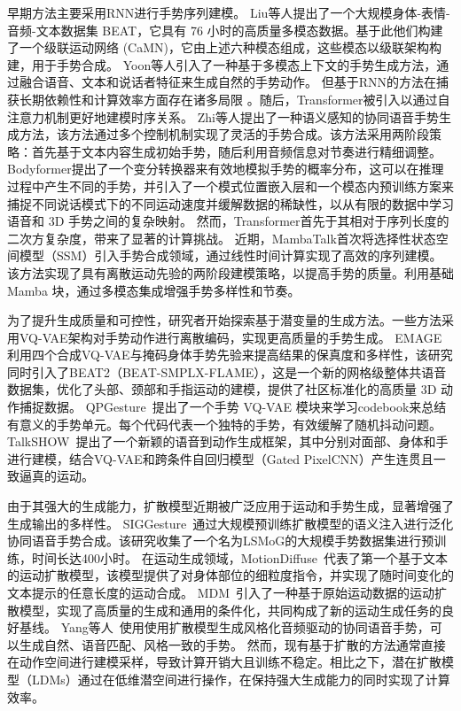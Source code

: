 早期方法主要采用RNN\cite{liu2022beat,yoon2020speech}进行手势序列建模。
Liu等人\cite{liu2022beat}提出了一个大规模身体-表情-音频-文本数据集 BEAT，它具有 76 小时的高质量多模态数据。基于此他们构建了一个级联运动网络 (CaMN)，它由上述六种模态组成，这些模态以级联架构构建，用于手势合成。
Yoon等人\cite{yoon2020speech}引入了一种基于多模态上下文的手势生成方法，通过融合语音、文本和说话者特征来生成自然的手势动作。
但基于RNN的方法在捕获长期依赖性和计算效率方面存在诸多局限
。随后，Transformer\cite{zhi2023livelyspeaker, pang2023bodyformer}被引入以通过自注意力机制更好地建模时序关系。
Zhi等人\cite{zhi2023livelyspeaker}提出了一种语义感知的协同语音手势生成方法，该方法通过多个控制机制实现了灵活的手势合成。该方法采用两阶段策略：首先基于文本内容生成初始手势，随后利用音频信息对节奏进行精细调整。
Bodyformer\cite{pang2023bodyformer}提出了一个变分转换器来有效地模拟手势的概率分布，这可以在推理过程中产生不同的手势，并引入了一个模式位置嵌入层和一个模态内预训练方案来捕捉不同说话模式下的不同运动速度并缓解数据的稀缺性，以从有限的数据中学习语音和 3D 手势之间的复杂映射。
然而，Transformer首先于其相对于序列长度的二次方复杂度，带来了显著的计算挑战。
近期，MambaTalk\cite{xu2025mambatalk}首次将选择性状态空间模型（SSM）引入手势合成领域，通过线性时间计算实现了高效的序列建模。该方法实现了具有离散运动先验的两阶段建模策略，以提高手势的质量。利用基础 Mamba 块，通过多模态集成增强手势多样性和节奏。

为了提升生成质量和可控性，研究者开始探索基于潜变量的生成方法。一些方法采用VQ-VAE架构对手势动作进行离散编码，实现更高质量的手势生成。
EMAGE~\cite{liu2024emage} 利用四个合成VQ-VAE与掩码身体手势先验来提高结果的保真度和多样性，该研究同时引入了BEAT2（BEAT-SMPLX-FLAME），这是一个新的网格级整体共语音数据集，优化了头部、颈部和手指运动的建模，提供了社区标准化的高质量 3D 动作捕捉数据。
QPGesture~\cite{yang2023qpgesture}提出了一个手势 VQ-VAE 模块来学习codebook来总结有意义的手势单元。每个代码代表一个独特的手势，有效缓解了随机抖动问题。
TalkSHOW~\cite{yi2023generating}提出了一个新颖的语音到动作生成框架，其中分别对面部、身体和手进行建模，结合VQ-VAE和跨条件自回归模型（Gated PixelCNN）产生连贯且一致逼真的运动。

由于其强大的生成能力，扩散模型\cite{cheng2024siggesture,alexanderson2023listen,tevet2022mdm,yang2023diffusestylegesture}近期被广泛应用于运动和手势生成，显著增强了生成输出的多样性。
SIGGesture~\cite{cheng2024siggesture}通过大规模预训练扩散模型的语义注入进行泛化协同语音手势合成。该研究收集了一个名为LSMoG的大规模手势数据集进行预训练，时间长达400小时。
在运动生成领域，MotionDiffuse~\cite{zhang2024motiondiffuse}代表了第一个基于文本的运动扩散模型，该模型提供了对身体部位的细粒度指令，并实现了随时间变化的文本提示的任意长度的运动合成。
MDM~\cite{tevet2022mdm}引入了一种基于原始运动数据的运动扩散模型，实现了高质量的生成和通用的条件化，共同构成了新的运动生成任务的良好基线。
Yang等人~\cite{yang2023diffusestylegesture}使用使用扩散模型生成风格化音频驱动的协同语音手势，可以生成自然、语音匹配、风格一致的手势。
然而，现有基于扩散的方法通常直接在动作空间进行建模采样，导致计算开销大且训练不稳定。相比之下，潜在扩散模型（LDMs）\cite{rombach2022high}通过在低维潜空间进行操作，在保持强大生成能力的同时实现了计算效率。


